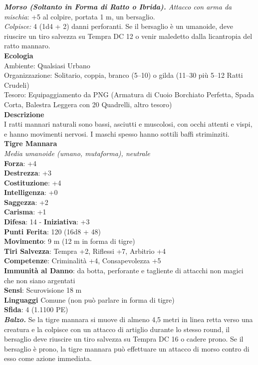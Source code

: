 \begin{multicols}{2}
\emph{\textbf{Morso (Soltanto in Forma di Ratto o Ibrida).} Attacco con arma da mischia}: +5 al colpire, portata 1 m, un bersaglio.\\

\emph{Colpisce:} 4 (1d4 + 2) danni perforanti. Se il bersaglio è un umanoide, deve riuscire un tiro salvezza su Tempra DC  12 o venir maledetto dalla licantropia del ratto mannaro.\\
\textbf{Ecologia}\\
Ambiente: Qualsiasi Urbano\\
Organizzazione: Solitario, coppia, branco (5–10) o gilda (11–30 più 5–12 Ratti Crudeli)\\
Tesoro: Equipaggiamento da PNG (Armatura di Cuoio Borchiato Perfetta, Spada Corta, Balestra Leggera con 20 Quadrelli, altro tesoro)\\
\textbf{Descrizione}\\
I ratti mannari naturali sono bassi, asciutti e muscolosi, con occhi attenti e vispi, e hanno movimenti nervosi. I maschi spesso hanno sottili baffi striminziti.\\

\medskip\textbf{Tigre Mannara}\\
\emph{Media umanoide (umano, mutaforma), neutrale}\\
\textbf{Forza}: +4\\
\textbf{Destrezza}: +3\\
\textbf{Costituzione}: +4\\
\textbf{Intelligenza}: +0\\
\textbf{Saggezza}: +2\\
\textbf{Carisma}: +1\\
\textbf{Difesa}: 14 - \textbf{Iniziativa}: +3\\
\textbf{Punti Ferita}: 120 (16d8 + 48)\\
\textbf{Movimento}: 9 m (12 m in forma di tigre)\\
\textbf{Tiri Salvezza}: Tempra +2, Riflessi +7, Arbitrio +4\\
\textbf{Competenze}: Criminalità +4, Consapevolezza +5\\
\textbf{Immunità al Danno}: da botta, perforante e tagliente di attacchi non magici che non siano argentati\\
\textbf{Sensi}: Scurovisione 18 m\\
\textbf{Linguaggi} Comune (non può parlare in forma di tigre)\\
\textbf{Sfida}: 4 (1.1100 PE)\smallskip\\
\emph{\textbf{Balzo.}} Se la tigre mannara si muove di almeno 4,5 metri in linea retta verso una creatura e la colpisce con un attacco di artiglio durante lo stesso round, il bersaglio deve riuscire un tiro salvezza su Tempra DC  16 o cadere prono. Se il bersaglio è prono, la tigre mannara può effettuare un attacco di morso contro di esso come azione immediata.\\


\end{multicols}
